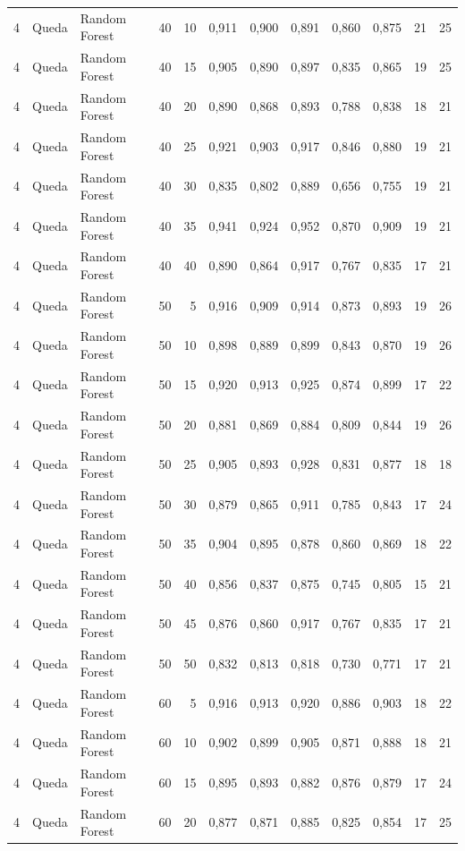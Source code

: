 \begin{longtable}{@{}rllrrrrrrrrr@{}}
4 & Queda & Random Forest & 40 & 10 & 0,911 & 0,900 & 0,891 & 0,860 & 0,875 & 21 & 25 \\
4 & Queda & Random Forest & 40 & 15 & 0,905 & 0,890 & 0,897 & 0,835 & 0,865 & 19 & 25 \\
4 & Queda & Random Forest & 40 & 20 & 0,890 & 0,868 & 0,893 & 0,788 & 0,838 & 18 & 21 \\
4 & Queda & Random Forest & 40 & 25 & 0,921 & 0,903 & 0,917 & 0,846 & 0,880 & 19 & 21 \\
4 & Queda & Random Forest & 40 & 30 & 0,835 & 0,802 & 0,889 & 0,656 & 0,755 & 19 & 21 \\
4 & Queda & Random Forest & 40 & 35 & 0,941 & 0,924 & 0,952 & 0,870 & 0,909 & 19 & 21 \\
4 & Queda & Random Forest & 40 & 40 & 0,890 & 0,864 & 0,917 & 0,767 & 0,835 & 17 & 21 \\
4 & Queda & Random Forest & 50 & 5 & 0,916 & 0,909 & 0,914 & 0,873 & 0,893 & 19 & 26 \\
4 & Queda & Random Forest & 50 & 10 & 0,898 & 0,889 & 0,899 & 0,843 & 0,870 & 19 & 26 \\
4 & Queda & Random Forest & 50 & 15 & 0,920 & 0,913 & 0,925 & 0,874 & 0,899 & 17 & 22 \\
4 & Queda & Random Forest & 50 & 20 & 0,881 & 0,869 & 0,884 & 0,809 & 0,844 & 19 & 26 \\
4 & Queda & Random Forest & 50 & 25 & 0,905 & 0,893 & 0,928 & 0,831 & 0,877 & 18 & 18 \\
4 & Queda & Random Forest & 50 & 30 & 0,879 & 0,865 & 0,911 & 0,785 & 0,843 & 17 & 24 \\
4 & Queda & Random Forest & 50 & 35 & 0,904 & 0,895 & 0,878 & 0,860 & 0,869 & 18 & 22 \\
4 & Queda & Random Forest & 50 & 40 & 0,856 & 0,837 & 0,875 & 0,745 & 0,805 & 15 & 21 \\
4 & Queda & Random Forest & 50 & 45 & 0,876 & 0,860 & 0,917 & 0,767 & 0,835 & 17 & 21 \\
4 & Queda & Random Forest & 50 & 50 & 0,832 & 0,813 & 0,818 & 0,730 & 0,771 & 17 & 21 \\
4 & Queda & Random Forest & 60 & 5 & 0,916 & 0,913 & 0,920 & 0,886 & 0,903 & 18 & 22 \\
4 & Queda & Random Forest & 60 & 10 & 0,902 & 0,899 & 0,905 & 0,871 & 0,888 & 18 & 21 \\
4 & Queda & Random Forest & 60 & 15 & 0,895 & 0,893 & 0,882 & 0,876 & 0,879 & 17 & 24 \\
4 & Queda & Random Forest & 60 & 20 & 0,877 & 0,871 & 0,885 & 0,825 & 0,854 & 17 & 25 \\

\end{longtable}
